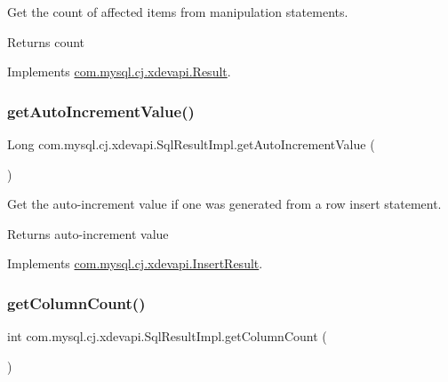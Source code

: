 Get the count of affected items from manipulation statements.

\begin{DoxyReturn}{Returns}
count 
\end{DoxyReturn}


Implements \mbox{\hyperlink{interfacecom_1_1mysql_1_1cj_1_1xdevapi_1_1_result_a6389cfd50f26c8efc0120b5f3072d228}{com.\+mysql.\+cj.\+xdevapi.\+Result}}.

\mbox{\label{classcom_1_1mysql_1_1cj_1_1xdevapi_1_1_sql_result_impl_ac1730d1c9d94a55bd5519e803be617e4}} 
\subsubsection{\texorpdfstring{get\+Auto\+Increment\+Value()}{getAutoIncrementValue()}}
{\footnotesize\ttfamily Long com.\+mysql.\+cj.\+xdevapi.\+Sql\+Result\+Impl.\+get\+Auto\+Increment\+Value (\begin{DoxyParamCaption}{ }\end{DoxyParamCaption})}

Get the auto-\/increment value if one was generated from a row insert statement.

\begin{DoxyReturn}{Returns}
auto-\/increment value 
\end{DoxyReturn}


Implements \mbox{\hyperlink{interfacecom_1_1mysql_1_1cj_1_1xdevapi_1_1_insert_result_a32144e23568f91aa21dab0b01cb6b14e}{com.\+mysql.\+cj.\+xdevapi.\+Insert\+Result}}.

\mbox{\label{classcom_1_1mysql_1_1cj_1_1xdevapi_1_1_sql_result_impl_a79fa6d1b15f715dc2d451ed8ec22493f}} 
\subsubsection{\texorpdfstring{get\+Column\+Count()}{getColumnCount()}}
{\footnotesize\ttfamily int com.\+mysql.\+cj.\+xdevapi.\+Sql\+Result\+Impl.\+get\+Column\+Count (\begin{DoxyParamCaption}{ }\end{DoxyParamCaption})}

